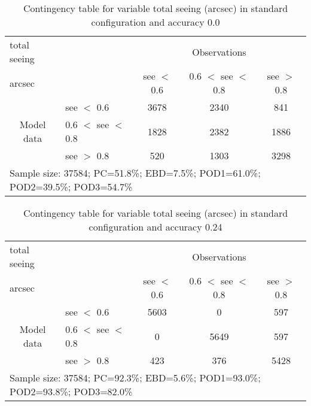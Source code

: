 \documentclass[11pt,english]{article}
\begin{document}
\newpage

\clearpage
\begin{table}[]
\begin{center}
\begin{tabular}{llccc}
\hline
{total seeing}                                       &                                                    & \multicolumn{3}{c}{Observations}                 \\
{arcsec}                                       &                             & see $<$ 0.6   & 0.6 $<$ see $<$ 0.8 & see $>$ 0.8 \\
\hline
\multicolumn{1}{c}{\multirow{3}{*}{Model data}}  & see $<$ 0.6             & 3678                & 2340                       & 841              \\
                                                 & 0.6  $<$ see $<$ 0.8 & 1828                & 2382                       & 1886              \\
                                                 & see $>$ 0.8             & 520                & 1303                       & 3298              \\
\hline
\multicolumn{5}{l}{Sample size: 37584; PC=51.8\%; EBD=7.5\%; POD1=61.0\%; POD2=39.5\%; POD3=54.7\%}
\end{tabular}
\end{center}
\caption{Contingency table for variable total seeing (arcsec) in standard configuration and accuracy 0.0}
\label{tab:contingencyseeBEF}
\end{table}
\begin{table}[]
\begin{center}
\begin{tabular}{llccc}
\hline
{total seeing}                                       &                                                    & \multicolumn{3}{c}{Observations}                 \\
{arcsec}                                       &                             & see $<$ 0.6   & 0.6 $<$ see $<$ 0.8 & see $>$ 0.8 \\
\hline
\multicolumn{1}{c}{\multirow{3}{*}{Model data}}  & see $<$ 0.6             & 5603                & 0                       & 597              \\
                                                 & 0.6  $<$ see $<$ 0.8 & 0                & 5649                       & 597              \\
                                                 & see $>$ 0.8             & 423                & 376                       & 5428              \\
\hline
\multicolumn{5}{l}{Sample size: 37584; PC=92.3\%; EBD=5.6\%; POD1=93.0\%; POD2=93.8\%; POD3=82.0\%}
\end{tabular}
\end{center}
\caption{Contingency table for variable total seeing (arcsec) in standard configuration and accuracy 0.24}
\label{tab:contingencyseeBEF}
\end{table}
\end{document}
